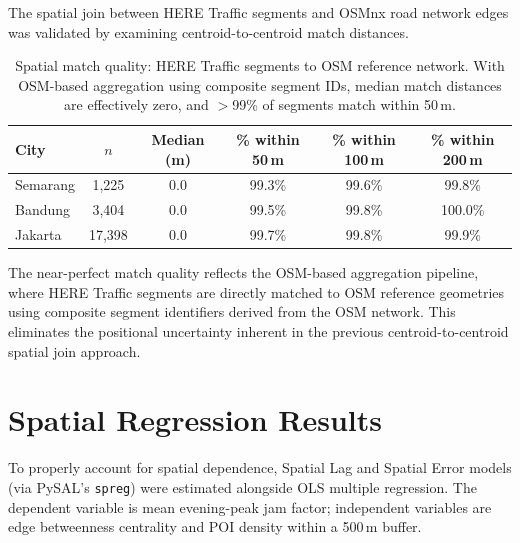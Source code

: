 \documentclass[preprint,12pt]{elsarticle}
\begin{document}
The spatial join between HERE Traffic segments and OSMnx road network edges was validated by examining centroid-to-centroid match distances.

\begin{table}[!htbp]
\centering
\caption{Spatial match quality: HERE Traffic segments to OSM reference network. With OSM-based aggregation using composite segment IDs, median match distances are effectively zero, and $>$99\% of segments match within 50\,m.}
\label{tab:s7}
\begin{tabular}{lccccc}
\toprule
City & $n$ & Median (m) & \% within 50\,m & \% within 100\,m & \% within 200\,m \\
\midrule
Semarang & 1,225  & 0.0 & 99.3\% & 99.6\% & 99.8\% \\
Bandung  & 3,404  & 0.0 & 99.5\% & 99.8\% & 100.0\% \\
Jakarta  & 17,398 & 0.0 & 99.7\% & 99.8\% & 99.9\% \\
\bottomrule
\end{tabular}
\end{table}

The near-perfect match quality reflects the OSM-based aggregation pipeline, where HERE Traffic segments are directly matched to OSM reference geometries using composite segment identifiers derived from the OSM network. This eliminates the positional uncertainty inherent in the previous centroid-to-centroid spatial join approach.

\section{Spatial Regression Results}
\label{sec:s6}

To properly account for spatial dependence, Spatial Lag and Spatial Error models (via PySAL's \texttt{spreg}) were estimated alongside OLS multiple regression. The dependent variable is mean evening-peak jam factor; independent variables are edge betweenness centrality and POI density within a 500\,m buffer.
\end{document}
